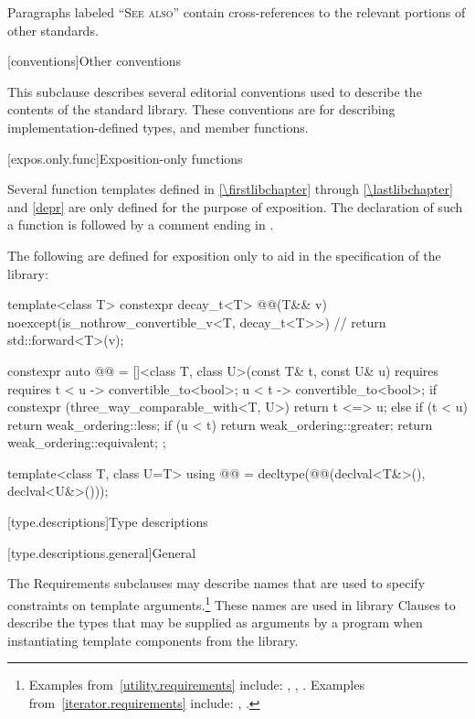 \pnum
Paragraphs labeled ``\textsc{See also}'' contain cross-references to the relevant portions
of other standards.

[conventions]{Other conventions}
%

\pnum
This subclause describes several editorial conventions used to describe the contents
of the \Cpp{} standard library.
These conventions are for describing
implementation-defined types,
and member functions.

[expos.only.func]{Exposition-only functions}

\pnum
Several function templates
defined in \ref{\firstlibchapter} through \ref{\lastlibchapter} and \ref{depr}
are only defined for the purpose of exposition.
The declaration of such a function is followed by a comment ending in \expos.

\pnum
The following are defined for exposition only
to aid in the specification of the library:
%
\begin{codeblock}
template<class T> constexpr decay_t<T> @@(T&& v)
    noexcept(is_nothrow_convertible_v<T, decay_t<T>>)           // \expos
  { return std::forward<T>(v); }

constexpr auto @@ =
  []<class T, class U>(const T& t, const U& u)
    requires requires {
      { t < u } -> convertible_to<bool>;
      { u < t } -> convertible_to<bool>;
    }
  {
    if constexpr (three_way_comparable_with<T, U>) {
      return t <=> u;
    } else {
      if (t < u) return weak_ordering::less;
      if (u < t) return weak_ordering::greater;
      return weak_ordering::equivalent;
    }
  };

template<class T, class U=T>
using @@ = decltype(@@(declval<T&>(), declval<U&>()));
\end{codeblock}

[type.descriptions]{Type descriptions}

[type.descriptions.general]{General}

\pnum
The Requirements subclauses may describe names that are used to specify
constraints on template arguments.\footnote{Examples
from~\ref{utility.requirements} include:
,
,
.
Examples from~\ref{iterator.requirements} include:
,
.}
These names are used in library Clauses
to describe the types that
may be supplied as arguments by a \Cpp{} program when instantiating template components from
the library.

